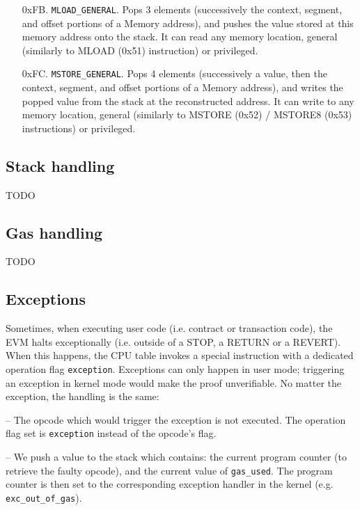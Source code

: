 \begin{enumerate}[align=left]
  \item[0xFB.] \texttt{MLOAD\_GENERAL}. Pops 3 elements (successively the context, segment, and offset portions of a Memory address), and pushes the value stored at this memory
  address onto the stack. It can read any memory location, general (similarly to MLOAD (0x51) instruction) or privileged.

  \item[0xFC.] \texttt{MSTORE\_GENERAL}. Pops 4 elements (successively a value, then the context, segment, and offset portions of a Memory address), and writes the popped value from
  the stack at the reconstructed address. It can write to any memory location, general (similarly to MSTORE (0x52) / MSTORE8 (0x53) instructions) or privileged.

\end{enumerate}


\subsection{Stack handling}

TODO

\subsection{Gas handling}

TODO

\subsection{Exceptions}

Sometimes, when executing user code (i.e. contract or transaction code), the EVM halts exceptionally (i.e. outside of a STOP, a RETURN or a REVERT).
When this happens, the CPU table invokes a special instruction with a dedicated operation flag \texttt{exception}.
Exceptions can only happen in user mode; triggering an exception in kernel mode would make the proof unverifiable.
No matter the exception, the handling is the same:

-- The opcode which would trigger the exception is not executed. The operation flag set is \texttt{exception} instead of the opcode's flag.

-- We push a value to the stack which contains: the current program counter (to retrieve the faulty opcode), and the current value of \texttt{gas\_used}.
The program counter is then set to the corresponding exception handler in the kernel (e.g. \texttt{exc\_out\_of\_gas}).

